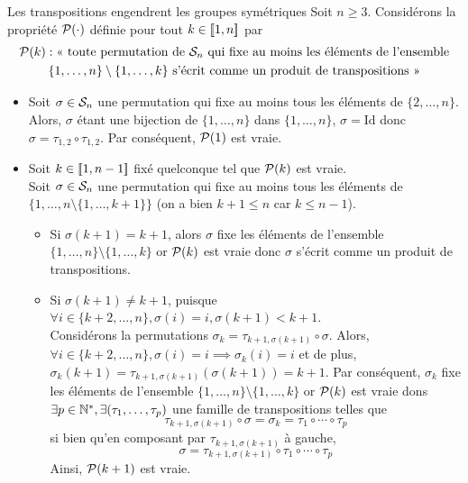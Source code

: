 \documentclass{article}
\renewenvironment{question_kholle}[2][ ]
{
	\subsection{\texorpdfstring{#2}{}}
	\notblank{#1}
	{
		\noindent #1
		\bigbreak
	}
	{}
	\begin{proof}
}
{
	\end{proof}
}
\begin{document}
\begin{question_kholle}{Les transpositions engendrent les groupes symétriques}
	Soit $n\geq 3$. Considérons la propriété $\mathcal P(\cdot)$ définie pour tout $k\in[\![ 1,n ]\!]$ par
	\begin{multline*}
		\mathcal P(k): \text{<<~toute permutation de $\mathcal{S}_{n}$ qui fixe au moins les éléments de l’ensemble} \\ \text{$\{1,\dots, n\}\setminus \{1,\dots, k\}$ s’écrit comme un produit de transpositions~>>}
	\end{multline*}
	\begin{itemize}
		\item Soit $\sigma\in\mathcal{S}_{n}$ une permutation qui fixe au moins tous les éléments de $\{2,\dots, n\}$. Alors, $\sigma$ étant une bijection de $\{1,\dots,n\}$ dans $\{1,\dots, n\}$, $\sigma=\mathrm{Id}$ donc $\sigma=\tau_{1,2}\circ \tau_{1,2}$. Par conséquent, $\mathcal P(1)$ est vraie.
		\item Soit $k\in[\![ 1,n-1 ]\!]$ fixé quelconque tel que $\mathcal P(k)$ est vraie.\\
		      Soit $\sigma\in\mathcal{S}_{n}$ une permutation qui fixe au moins tous les éléments de $\{1,\dots,n\setminus \{1,\dots,k+1\}\}$ (on a bien $k+1\leq n$ car $k\leq n-1$).
		      \begin{itemize}
			      \item Si $\sigma(k+1)=k+1$, alors $\sigma$ fixe les éléments de l’ensemble $\{1,\dots,n\}\setminus \{1,\dots,k\}$ or $\mathcal P(k)$ est vraie donc $\sigma$ s’écrit comme un produit de transpositions.
			      \item Si $\sigma(k+1)\neq k+1$, puisque $\forall i\in\{k+2,\dots, n\}, \sigma(i)=i, \sigma(k+1)<k+1$.\\
			            Considérons la permutations $\sigma_{k} = \tau_{k+1,\sigma(k+1)}\circ \sigma$. Alors, $\forall i\in\{k+2,\dots,n\},\sigma(i) = i \implies \sigma_{k}(i)=i$ et de plus, $\sigma_{k}(k+1)=\tau_{k+1,\sigma(k+1)}(\sigma(k+1)) = k+1$. Par conséquent, $\sigma_{k}$ fixe les éléments de l’ensemble $\{1,\dots,n\}\setminus\{1,\dots,k\}$ or $\mathcal P(k)$ est vraie dons $\exists p\in\mathbb N^{*}, \exists (\tau_{1},\dots, \tau_{p})$ une famille de transpositions telles que
			            \[
				            \tau_{k+1,\sigma(k+1)}\circ \sigma = \sigma_{k} = \tau_{1}\circ \cdots \circ \tau_{p}
			            \]
			            si bien qu’en composant par $\tau_{k+1,\sigma(k+1)}$ à gauche,
			            \[
				            \sigma=\tau_{k+1,\sigma(k+1)}\circ \tau_{1}\circ\cdots\circ \tau_{p}
			            \]
			            Ainsi, $\mathcal P(k+1)$ est vraie.
		      \end{itemize}
	\end{itemize}


\end{question_kholle}
\end{document}
